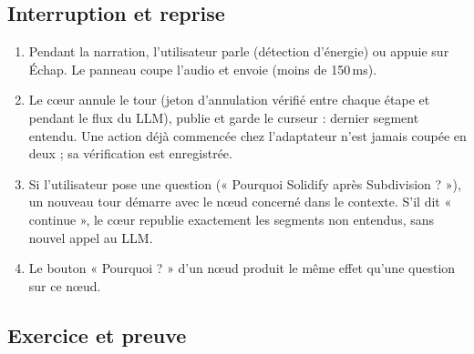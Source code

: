 \subsection{Interruption et reprise}

\begin{enumerate}[leftmargin=1.2em]
  \item Pendant la narration, l'utilisateur parle (détection d'énergie) ou appuie sur Échap. Le panneau coupe l'audio et envoie  (moins de 150\,ms).
  \item Le cœur annule le tour (jeton d'annulation vérifié entre chaque étape et pendant le flux du LLM), publie  et garde le curseur : dernier segment entendu. Une action déjà commencée chez l'adaptateur n'est jamais coupée en deux ; sa vérification est enregistrée.
  \item Si l'utilisateur pose une question (« Pourquoi Solidify après Subdivision ? »), un nouveau tour démarre avec le nœud concerné dans le contexte. S'il dit « continue », le cœur republie exactement les segments non entendus, sans nouvel appel au LLM.
  \item Le bouton « Pourquoi ? » d'un nœud produit le même effet qu'une question sur ce nœud.
\end{enumerate}

\subsection{Exercice et preuve}

\begin{center}
\end{center}

